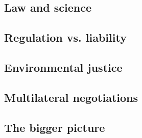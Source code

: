 \documentclass[../summary.tex]{subfiles}
\begin{document}
	\subsection{Law and science}
	
	\subsection{Regulation vs. liability}
	
	\subsection{Environmental justice}
	
	\subsection{Multilateral negotiations}
	
	\subsection{The bigger picture}
\end{document}
